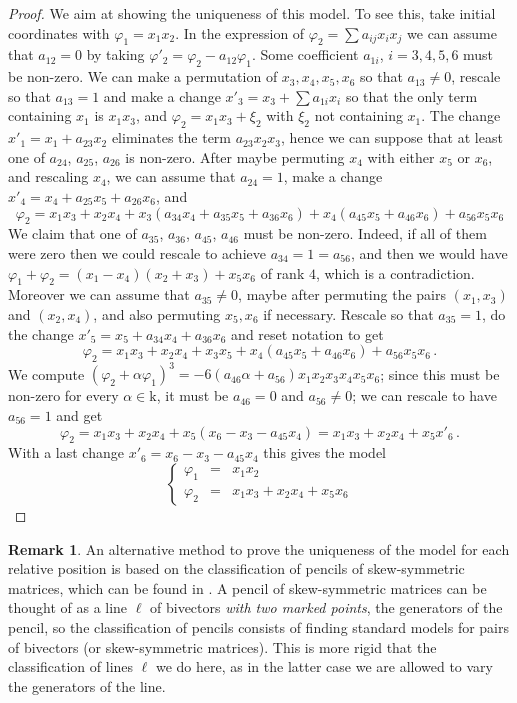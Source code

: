 \documentclass[10pt,reqno]{amsart}
\renewcommand{\a}{\alpha}
\newcommand{\f}{\varphi}
\newcommand{\kk}{\mathrm{k}}
\theoremstyle{definition}
\newtheorem{remark}[theorem]{Remark}
\begin{document}
\begin{proof}
\noindent We aim at showing the uniqueness of this model. To see this, take initial coordinates with $\f_1=x_1x_2$. In the expression of $\f_2=\sum a_{ij} x_ix_j$ we can assume that $a_{12}=0$ by taking $\f'_2=\f_2-a_{12} \f_1$. Some coefficient $a_{1i}$, $i=3,4,5,6$ must be non-zero. We can make a permutation of $x_3,x_4,x_5, x_6$ so that $a_{13} \ne 0$, rescale so that $a_{13}=1$ and make a change $x'_3=x_3+ \sum a_{1i} x_i$ so that the only term containing $x_1$ is $x_1x_3$, and $\f_2=x_1x_3 + \xi_2$ with $\xi_2$ not containing $x_1$. The change $x'_1=x_1+a_{23}x_2$ eliminates the term $a_{23}x_2x_3$, hence we can suppose that at least one of $a_{24}$, $a_{25}$, $a_{26}$ is non-zero. After maybe permuting $x_4$ with either $x_5$ or $x_6$, and rescaling $x_4$, we can assume that $a_{24} =1$, make a change $x'_4=x_4+a_{25}x_5+a_{26}x_6$, and
\[
\f_2=x_1x_3+x_2x_4 + x_3(a_{34}x_4+a_{35}x_5+a_{36}x_6)+x_4(a_{45}x_5+a_{46}x_6)+a_{56}x_5x_6
\]
We claim that one of $a_{35}$, $a_{36}$, $a_{45}$, $a_{46}$ must be non-zero. Indeed, if all of them were zero then we could rescale to achieve $a_{34}=1=a_{56}$, and then we would have $\f_1+\f_2=(x_1-x_4)(x_2+x_3)+x_5x_6$ of rank $4$, which is a contradiction. Moreover we can assume that $a_{35} \ne 0$, maybe after permuting the pairs $(x_1,x_3)$ and $(x_2,x_4)$, and also permuting $x_5, x_6$ if necessary. Rescale so that $a_{35}=1$, do the change $x'_5=x_5+a_{34}x_4+a_{36}x_6$ and reset notation to get
\[
\f_2=x_1x_3+x_2x_4 + x_3x_5+x_4(a_{45}x_5+a_{46}x_6)+a_{56}x_5x_6\,.
\]
We compute $(\f_2+\a \f_1)^3=-6(a_{46} \a +a_{56})x_1x_2x_3x_4x_5x_6$; since this must be non-zero for every $\alpha\in\kk$, it must be $a_{46}=0$ and $a_{56} \ne 0$; we can rescale to have $a_{56}=1$ and get
\[
\f_2=x_1x_3+x_2x_4+x_5(x_6-x_3-a_{45}x_4)=x_1x_3+x_2x_4+x_5x'_6\,.
\]
With a last change $x'_6=x_6-x_3-a_{45}x_4$ this gives the model
\[
\left\{\begin{array}{ccl}
 \f_1 & = & x_1x_2\\
 \f_2 & = & x_1x_3+x_2x_4+x_5x_6
\end{array}\right.
\]
\end{proof}

\begin{remark}
An alternative method to prove the uniqueness of the model for each relative position is based on the classification of pencils of skew-symmetric matrices, which can be found in \cite{Gant}. A pencil of skew-symmetric matrices can be thought of as a line $\ell$ of bivectors \emph{with two marked points}, the generators of the pencil, so the classification of pencils consists of finding standard models for pairs of bivectors (or skew-symmetric matrices). This is more rigid that the classification of lines $\ell$ we do here, as in the latter case we are allowed to vary the generators of the line.
\end{remark}
\end{document}
